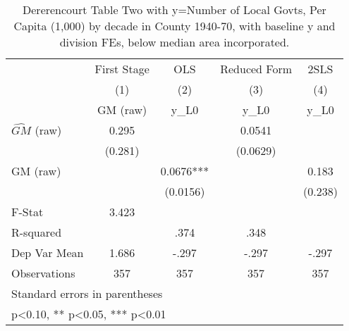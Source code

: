 \begin{table}[htbp]\centering
\def\sym#1{\ifmmode^{#1}\else\(^{#1}\)\fi}
\caption{Dererencourt Table Two with y=Number of Local Govts, Per Capita (1,000) by decade in County 1940-70, with baseline y and division FEs, below median area incorporated.}
\begin{tabular}{l*{4}{c}}
\toprule
                    & First Stage   &         OLS   &Reduced Form   &        2SLS   \\
                    &\multicolumn{1}{c}{(1)}&\multicolumn{1}{c}{(2)}&\multicolumn{1}{c}{(3)}&\multicolumn{1}{c}{(4)}\\
                    &\multicolumn{1}{c}{GM  (raw)}&\multicolumn{1}{c}{y\_L0}&\multicolumn{1}{c}{y\_L0}&\multicolumn{1}{c}{y\_L0}\\
\midrule
$\hat{GM}$ (raw)    &       0.295   &               &      0.0541   &               \\
                    &     (0.281)   &               &    (0.0629)   &               \\
\addlinespace
GM  (raw)           &               &      0.0676***&               &       0.183   \\
                    &               &    (0.0156)   &               &     (0.238)   \\
\midrule
F-Stat              &       3.423   &               &               &               \\
R-squared           &               &        .374   &        .348   &               \\
Dep Var Mean        &       1.686   &       -.297   &       -.297   &       -.297   \\
Observations        &         357   &         357   &         357   &         357   \\
\bottomrule
\multicolumn{5}{l}{\footnotesize Standard errors in parentheses}\\
\multicolumn{5}{l}{\footnotesize * p<0.10, ** p<0.05, *** p<0.01}\\
\end{tabular}
\end{table}
